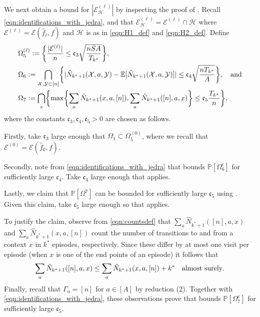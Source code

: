 \documentclass[11pt]{article}
\newcommand{\eqdef}{\vcentcolon=}
\newcommand{\mf}[1]{\mathfrak{#1}}
\newcommand{\mcE}{\mathcal{E}}
\newcommand{\mcH}{\mathcal{H}}
\newcommand{\mcX}{\mathcal{X}}
\newcommand{\mcY}{\mathcal{Y}}
\newcommand{\mbbP}{\mathbb{P}}
\newcommand{\mbbE}{\mathbb{E}}
\theoremstyle{definition}
\theoremstyle{definition}
\begin{document}
We next obtain a bound for $|\mcE_{\mcH}^{(\ell)}|$ by inspecting the proof of \cite[Proposition 21]{Jedra:2022}.
Recall \eqref{eqn:identifications_with_jedra}, and that $\mcE_{\mcH}^{(\ell)}=\mcE^{(\ell)}\cap\mcH$ where $\mcE^{(\ell)}=\mcE(\hat{f}_{\ell},f)$ and $\mcH$ is as in \eqref{eqn:H1_def} and \eqref{eqn:H2_def}.
Define
\begin{align}
	 &
	\Omega_5^{(\ell)}\eqdef \biggl\{\frac{|\mcE^{(\ell)}|}{n}\leq \mf{c}_3\sqrt{\frac{nSA}{T_{k^*}}}\biggr\}
	,
	\nonumber
	\\
	 &
	\Omega_6\eqdef\bigcap_{\mcX,\mcY\subset[n]}\biggl\{|\hat{N}_{k^*+1}(\mcX,a,\mcY)-\mbbE[\hat{N}_{k^*+1}(\mcX,a,\mcY)]|\leq \mf{c}_4\sqrt{\frac{nT_{k^*}}{A}}\biggr\}
	,
	\quad
	\textnormal{and}
	\label{eqn:definition_of_events_E_H}
	\\
	 &
	\Omega_7
	\eqdef
	\bigcap_{x}
	\biggl\{
	\max
	\biggl\{\sum_{a}\hat{N}_{k^*+1}(x,a,[n]),\sum_{a}\hat{N}_{k^*+1}([n],a,x)\biggr\}\leq \mf{c}_5\frac{T_{k^*}}{n}
	\biggr\}
	,
	\nonumber
\end{align}
where the constants $\mf{c}_3,\mf{c}_4,\mf{c}_5>0$ are chosen as follows.

Firstly, take $\mf{c}_3$ large enough that $\Omega_1\subset\Omega_5^{(0)}$, where we recall that $\mcE^{(0)}=\mcE(\hat{f}_{0},f)$.

Secondly, note from \eqref{eqn:identifications_with_jedra} that \cite[Proposition 24]{Jedra:2022} bounds $\mbbP[\Omega_6^{\mathrm{c}}]$ for sufficiently large $\mf{c}_4$.
Take $\mf{c}_4$ large enough that \cite[Proposition 24]{Jedra:2022} applies.

Lastly, we claim that $\mbbP[\Omega^7]$ can be bounded for sufficiently large $\mf{c}_5$ using \cite[Lemma 17]{Jedra:2022}.
Given this claim, take $\mf{c}_5$ large enough so that \cite[Lemma 17]{Jedra:2022} applies.

To justify the claim, observe from \eqref{eqn:countsdef} that $\sum_{a}\hat{N}_{k^*+1}([n],a,x)$ and $\sum_{a}\hat{N}_{k^*+1}(x,a,[n])$ count the number of transitions to and from a context $x$ in $k^*$ episodes, respectively.
Since these differ by at most one visit per episode (when $x$ is one of the end points of an episode) it follows that
\begin{equation}
	\sum_{a}\hat{N}_{k^*+1}([n],a,x)\leq \sum_{a}\hat{N}_{k^*+1}(x,a,[n])+k^*
	\quad
	\textnormal{almost surely}.
\end{equation}
Finally, recall that $\Gamma_a=[n]$ for $a\in[A]$ by reduction (2).
Together with \eqref{eqn:identifications_with_jedra}, these observations prove that \cite[Lemma 17]{Jedra:2022} bounds $\mbbP[\Omega_7^{\mathrm{c}}]$ for sufficiently large $\mf{c}_5$.
\end{document}
